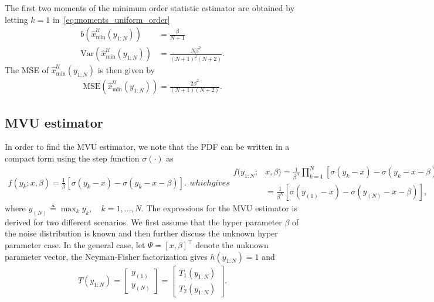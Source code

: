 \documentclass{article}
\newcommand{\Var}{\mathrm{Var}}
\newcommand{\MSE}{\mathrm{MSE}}
\begin{document}
%
%
The first two moments of the minimum order statistic estimator are obtained by letting $k=1$ in~\eqref{eq:moments_uniform_order}
%
%
\begin{subequations}\label{eq:moments_uniform_min}
	\begin{align}
	b\left(\hat{x}_{\mathrm{min}}^{\mathcal{U}}(y_{1:N})\right) &= \frac{\beta}{N+1}\\
	\Var\left(\hat{x}_{\mathrm{min}}^{\mathcal{U}}(y_{1:N})\right) &= \frac{N\beta^2}{(N+1)^2(N+2)}.
	\end{align}
\end{subequations}
%
%
The MSE of $\hat{x}_{\mathrm{min}}^{\mathcal{U}}(y_{1:N})$ is then given by
%
%
\begin{align}
\MSE\left(\hat{x}_{\mathrm{min}}^{\mathcal{U}}(y_{1:N})\right) = \frac{2\beta^2}{(N+1)(N+2)}.
\label{eq:mse_min_uniform}
\end{align}
%
%
\subsection{MVU estimator}\label{subsec:mvu_estimator}
In order to find the MVU estimator, we note that the PDF can be written in a compact form using the step function $\sigma(\cdot)$ as
\begin{subequations}
	\begin{align}
	f(y_k;x,\beta) = \frac{1}{\beta}\left[\sigma(y_k-x) - \sigma(y_k-x-\beta)\right].
	\label{eq:uniform_pdf_single}
	\end{align}
	which gives
	\begin{align}
	f(y_{1:N};&x,\beta) = \frac{1}{\beta^N}\prod_{k=1}^{N}\left[\sigma(y_k-x) - \sigma(y_k-x-\beta)\right]\nonumber\\
	&=\frac{1}{\beta^N}\left[\sigma( y_{(1)} -x) - \sigma(y_{(N)}-x -\beta)\right],%
	\label{eq:unknown}
	\end{align}
\end{subequations}
%
%
where $y_{(N)}\triangleq\max_k y_k,\quad k=1,\ldots,N$.
The expressions for the MVU estimator is derived for two different scenarios. We first assume that the hyper parameter $\beta$ of the noise distribution is known and then further discuss the unknown hyper parameter case.  In the general case, let $\Psi = [x,\beta]^\top$ denote the unknown parameter vector, the Neyman-Fisher factorization gives $h(y_{1:N})=1$ and 
%
%
\begin{align}
T(y_{1:N}) = \begin{bmatrix}
y_{(1)} \\ y_{(N)}
\end{bmatrix} = \begin{bmatrix}
T_1(y_{1:N}) \\ T_2(y_{1:N})
\end{bmatrix}.
\label{eq:uniform_ss}
\end{align}
%
%
\end{document}
